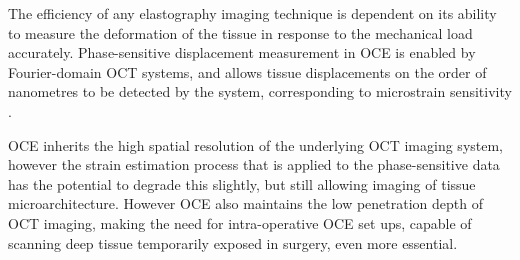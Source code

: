 The efficiency of any elastography imaging technique is dependent on its ability to measure the deformation of the tissue in response to the mechanical load accurately. Phase-sensitive displacement measurement in OCE is enabled by Fourier-domain OCT systems, and allows tissue displacements on the order of nanometres to be detected by the system, corresponding to microstrain sensitivity \cite{kennedy_review_2014}. 

OCE inherits the high spatial resolution of the underlying OCT imaging system, however the strain estimation process that is applied to the phase-sensitive data has the potential to degrade this slightly, but still allowing imaging of tissue microarchitecture. However OCE also maintains the low penetration depth of OCT imaging, making the need for intra-operative OCE set ups, capable of scanning deep tissue temporarily exposed in surgery, even more essential. 
